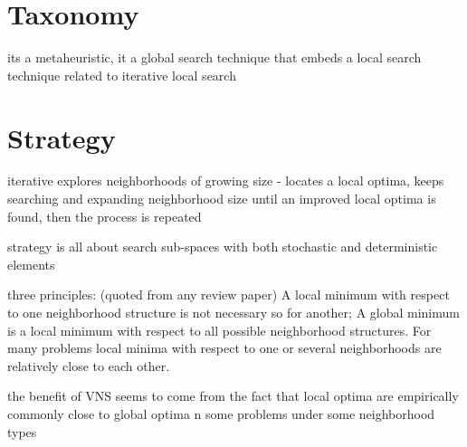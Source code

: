 \documentclass[a4paper, 11pt]{article}
\begin{document}
\section{Taxonomy}
\label{sec:taxonomy}
its a metaheuristic, it a global search technique that embeds a local search technique
related to iterative local search

\section{Strategy}
\label{sec:strategy}

iterative explores neighborhoods of growing size - locates a local optima, keeps searching and expanding neighborhood size until an improved local optima is found, then the process is repeated

strategy is all about search sub-spaces with both stochastic and deterministic elements

three principles: (quoted from any review paper) A local minimum with respect to one neighborhood structure is not necessary so for another; A global minimum is a local minimum with respect to all possible neighborhood structures.  For many problems local minima with respect to one or several neighborhoods are relatively close to each other.

the benefit of VNS seems to come from the fact that local optima are empirically commonly close to global optima n some problems under some neighborhood types 
\end{document}
